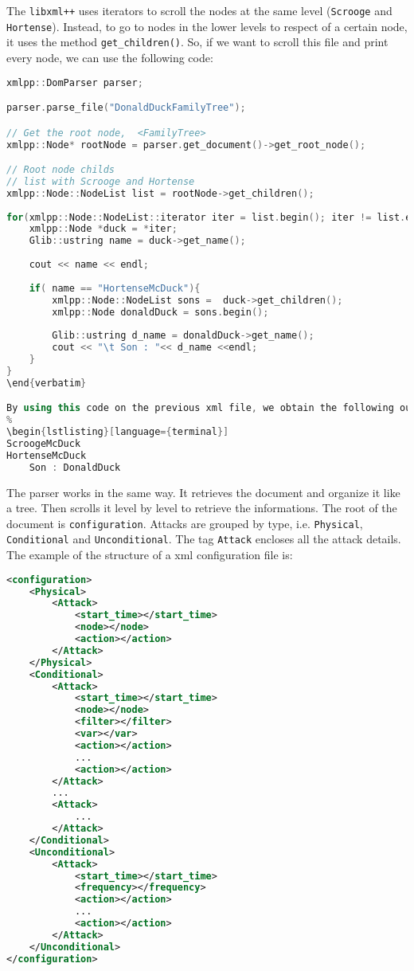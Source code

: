 The \texttt{libxml++} uses iterators to scroll the nodes at the same level (\texttt{Scrooge} and \texttt{Hortense}). Instead, to go to nodes in the lower levels to respect of a certain node, it uses the method \texttt{get\_children()}. 
So, if we want to scroll this file and print every node, we can use the following code:
%
\begin{lstlisting}[language={cpp}]
xmlpp::DomParser parser;

parser.parse_file("DonaldDuckFamilyTree");

// Get the root node,  <FamilyTree>
xmlpp::Node* rootNode = parser.get_document()->get_root_node(); 

// Root node childs
// list with Scrooge and Hortense
xmlpp::Node::NodeList list = rootNode->get_children(); 
		
for(xmlpp::Node::NodeList::iterator iter = list.begin(); iter != list.end(); ++iter) {
	xmlpp::Node *duck = *iter;
	Glib::ustring name = duck->get_name();
    
	cout << name << endl;
    
	if( name == "HortenseMcDuck"){ 
		xmlpp::Node::NodeList sons =  duck->get_children();
		xmlpp::Node donaldDuck = sons.begin();
		 
		Glib::ustring d_name = donaldDuck->get_name();
		cout << "\t Son : "<< d_name <<endl;
	}
}
\end{verbatim}

By using this code on the previous xml file, we obtain the following output:
%
\begin{lstlisting}[language={terminal}]
ScroogeMcDuck
HortenseMcDuck
	Son : DonaldDuck
\end{lstlisting}

The parser works in the same way. It retrieves the document and organize it like a tree. Then scrolls it level by level to retrieve the informations.
The root of the document is \texttt{configuration}. Attacks are grouped by type, i.e. \texttt{Physical}, \texttt{Conditional} and \texttt{Unconditional}. 
The tag \texttt{Attack} encloses all the attack details. The example of the structure of a xml configuration file is:
%
\begin{lstlisting}[language={xml}]
<configuration>
	<Physical>
		<Attack>
			<start_time></start_time>
			<node></node>
			<action></action>
		</Attack>
	</Physical>
	<Conditional>
		<Attack>
			<start_time></start_time>
			<node></node>
			<filter></filter>
			<var></var>
			<action></action>
			...
			<action></action>
		</Attack>
		...
		<Attack>
            ...
		</Attack>
	</Conditional>
	<Unconditional>
		<Attack>
			<start_time></start_time>
			<frequency></frequency>
			<action></action>
			...
			<action></action>
		</Attack>
	</Unconditional>
</configuration>
\end{lstlisting}

